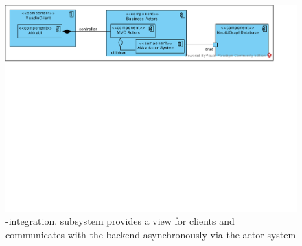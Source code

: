 



\begin{figure}[h]
  \centering
  \includegraphics[scale=.45]{figures/VaadinAkkaIntegration.pdf}
  \caption{\vaadin-\akka integration. \vaadin subsystem provides a
    view for clients and communicates with the backend asynchronously
    via the \akka actor system}
  \label{fig:vaadin-akka-integration}
\end{figure}




